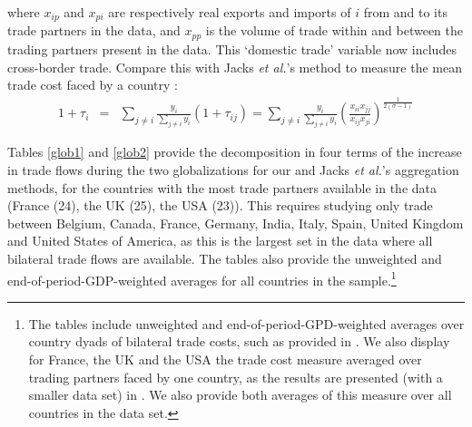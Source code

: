 \documentclass{article}
\begin{document}
where $x_{ip}$ and $x_{pi}$ are respectively real exports and
imports of $i$ from and to its trade partners in the data, and
$x_{pp}$ is the volume of trade within and between the trading
partners present in the data. This `domestic trade' variable
now
includes cross-border trade. Compare this with Jacks \textit{et al.}'s  method to measure the mean trade cost faced by a country : 
\begin{eqnarray}
1+\tau_i&=& \sum_{j \neq i}  {\frac{y_i}{\sum_{j \neq i} y_i} \left(1+\tau_{ij}\right)}
= \sum_{j \neq i}  {\frac{y_i}{\sum_{j \neq i} y_i} \left( \frac{x_{ii} x_{jj}}{x_{ij} x_{ji}}\right)^{\frac{1}{2(\sigma-1)}} }
 \label{jackssection3}
\end{eqnarray}

Tables \ref{glob1} and \ref{glob2} provide the decomposition in four terms of the increase in trade flows during the two globalizations for our and Jacks \textit{et al.}'s aggregation methods, for the countries with the most trade partners available in the data (France (24), the UK (25), the USA (23)).
This requires studying only trade between Belgium, Canada, France, Germany, India, Italy, Spain, United Kingdom and United States of America, as this is the largest set in the data where all bilateral trade flows are available. 
The tables also provide the unweighted and end-of-period-GDP-weighted averages for all countries in the sample.\footnote{The tables include unweighted and
	end-of-period-GPD-weighted averages over country dyads of
	bilateral trade costs, such as provided in \cite{JMN2011}.
	We also display for France, the UK and the USA the trade cost measure averaged over trading partners faced by one country, as the results are presented (with a smaller data set) in
	\cite{JMN2008, JMN2010}.
	We also provide both averages of this measure over all countries in the data set.}\\
\end{document}
